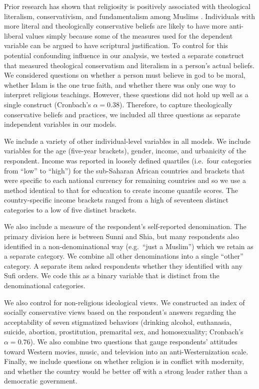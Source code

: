 \documentclass[10pt,letterpaper]{article}
\begin{document}
Prior research has shown that religiosity is positively associated with
theological literalism, conservativism, and fundamentalism among Muslims
\cite{moaddel_religious_2018}. Individuals with more literal and
theologically conservative beliefs are likely to have more anti-liberal
values simply because some of the measures used for the dependent
variable can be argued to have scriptural justification. To control for
this potential confounding influence in our analysis, we tested a
separate construct that measured theological conservatism and literalism
in a person's actual beliefs. We considered questions on whether a
person must believe in god to be moral, whether Islam is the one true
faith, and whether there was only one way to interpret religious
teachings. However, these questions did not hold up well as a single
construct (Cronbach's \(\alpha=0.38\)). Therefore, to capture
theologically conservative beliefs and practices, we included all three
questions as separate independent variables in our models.

We include a variety of other individual-level variables in all models.
We include variables for the age (five-year brackets), gender, income,
and urbanicity of the respondent. Income was reported in loosely defined
quartiles (i.e.~four categories from ``low'' to ``high'') for the
sub-Saharan African countries and brackets that were specific to each
national currency for remaining countries and so we use a method
identical to that for education to create income quantile scores. The
country-specific income brackets ranged from a high of seventeen
distinct categories to a low of five distinct brackets.

We also include a measure of the respondent's self-reported
denomination. The primary division here is between Sunni and Shia, but
many respondents also identified in a non-denominational way
(e.g.~``just a Muslim'') which we retain as a separate category. We
combine all other denominations into a single ``other'' category. A
separate item asked respondents whether they identified with any Sufi
orders. We code this as a binary variable that is distinct from the
denominational categories.

We also control for non-religious ideological views. We constructed an
index of socially conservative views based on the respondent's answers
regarding the acceptability of seven stigmatized behaviors (drinking
alcohol, euthanasia, suicide, abortion, prostitution, premarital sex,
and homosexuality; Cronbach's \(\alpha=0.76\)). We also combine two
questions that gauge respondents' attitudes toward Western movies,
music, and television into an anti-Westernization scale. Finally, we
include questions on whether religion is in conflict with modernity, and
whether the country would be better off with a strong leader rather than
a democratic government.
\end{document}
